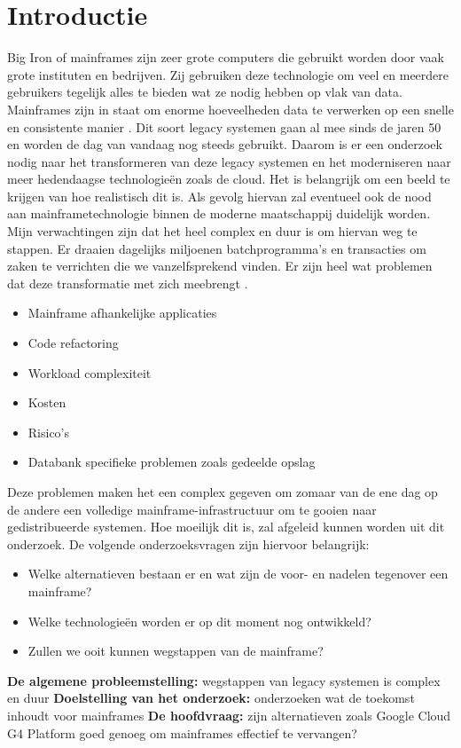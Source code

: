 
\section{Introductie} %
\label{sec:introductie}
Big Iron of mainframes zijn zeer grote computers die gebruikt worden door vaak grote instituten en bedrijven. Zij gebruiken deze technologie om veel en meerdere gebruikers tegelijk alles te bieden wat ze nodig hebben op vlak van data. Mainframes zijn in staat om enorme hoeveelheden data te verwerken op een snelle en consistente manier \autocite{Ebbers2022}. Dit soort legacy systemen gaan al mee sinds de jaren 50 en worden de dag van vandaag nog steeds gebruikt. Daarom is er een onderzoek nodig naar het transformeren van deze legacy systemen en het moderniseren naar meer hedendaagse technologieën zoals de cloud. Het is belangrijk om een beeld te krijgen van hoe realistisch dit is. Als gevolg hiervan zal eventueel ook de nood aan mainframetechnologie binnen de moderne maatschappij duidelijk worden. Mijn verwachtingen zijn dat het heel complex en duur is om hiervan weg te stappen. Er draaien dagelijks miljoenen batchprogramma’s en transacties om zaken te verrichten die we vanzelfsprekend vinden. Er zijn heel wat problemen dat deze transformatie met zich meebrengt  \autocite{Long2018}.
\begin{itemize}
    \item Mainframe afhankelijke applicaties
    \item Code refactoring
    \item Workload complexiteit
    \item Kosten
    \item Risico's
    \item Databank specifieke problemen zoals gedeelde opslag
\end{itemize}
Deze problemen maken het een complex gegeven om zomaar van de ene dag op de andere een volledige mainframe-infrastructuur om te gooien naar gedistribueerde systemen. Hoe moeilijk dit is, zal afgeleid kunnen worden uit dit onderzoek. De volgende onderzoeksvragen zijn hiervoor belangrijk:
\begin{itemize}
    \item Welke alternatieven bestaan er en wat zijn de voor- en nadelen tegenover een mainframe?
    \item Welke technologieën worden er op dit moment nog ontwikkeld?
    \item Zullen we ooit kunnen wegstappen van de mainframe?
\end{itemize}
\textbf{De algemene probleemstelling:} wegstappen van legacy systemen is complex en duur \newline
\textbf{Doelstelling van het onderzoek:} onderzoeken wat de toekomst inhoudt voor mainframes \newline
\textbf{De hoofdvraag:} zijn alternatieven zoals Google Cloud G4 Platform goed genoeg om mainframes effectief te vervangen?

